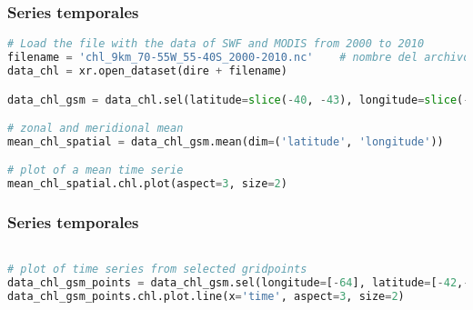 \documentclass{beamer}
\begin{document}
\begin{frame}[t, fragile]
\frametitle{Series temporales}

\begin{lstlisting}[language=python, basicstyle=\scriptsize]
# Load the file with the data of SWF and MODIS from 2000 to 2010
filename = 'chl_9km_70-55W_55-40S_2000-2010.nc'    # nombre del archivo
data_chl = xr.open_dataset(dire + filename)

data_chl_gsm = data_chl.sel(latitude=slice(-40, -43), longitude=slice(-65, -60))    # select an area

# zonal and meridional mean
mean_chl_spatial = data_chl_gsm.mean(dim=('latitude', 'longitude'))

# plot of a mean time serie
mean_chl_spatial.chl.plot(aspect=3, size=2)
\end{lstlisting}

\begin{figure}
	
	
\end{figure}

\end{frame}

\begin{frame}[t, fragile]
\frametitle{Series temporales}

\begin{lstlisting}[language=python, basicstyle=\scriptsize]

# plot of time series from selected gridpoints
data_chl_gsm_points = data_chl_gsm.sel(longitude=[-64], latitude=[-42,-43], method='nearest').squeeze()
data_chl_gsm_points.chl.plot.line(x='time', aspect=3, size=2)
\end{lstlisting}

\begin{figure}
	
	
\end{figure}

\end{frame}
\end{document}
